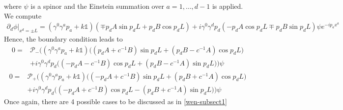  where $\psi $ is a spinor and the Einstein summation over $a = 1, \ldots, d-1$ is applied. \\
 We compute
\begin{equation*}
\begin{split}
\partial_d \phi\vert_{x^d = \pm L }
= (\gamma^0\gamma^a p_a + k\mathbb{1})(\mp p_d A \sin p_d L + p_d B \cos p_d L)
+ i\gamma^0\gamma^d p_d(-p_d A \cos p_d L \mp p_d B \sin p_d L)\psi e^{-ip_a x^a}
\end{split}
\end{equation*}
Hence, the boundary condition leads to
\begin{equation*}
\begin{split}
0 = &\mathcal{P}_-\Bigg(
(\gamma^0\gamma^a p_a + k\mathbb{1})\Big((p_d A + c^{-1}B) \sin p_d L + (p_d B - c^{-1}A) \cos p_d L\Big) \\
& + i\gamma^0\gamma^d p_d \Big((-p_d A -c^{-1} B) \cos p_d L + (p_d B - c^{-1} A )\sin p_d L\Big) 
\Bigg)\psi
\end{split}
\end{equation*}
\begin{equation*}
\begin{split}
0 = &\mathcal{P}_+\Bigg(
(\gamma^0\gamma^a p_a + k\mathbb{1})\Big((- p_d A + c^{-1}B) \sin p_d L + (p_d B + c^{-1}A) \cos p_d L\Big) \\
& + i\gamma^0\gamma^d p_d \Big((-p_d A + c^{-1} B )\cos p_d L - (p_d B + c^{-1} A )\sin p_d L\Big) 
\Bigg)\psi
\end{split}
\end{equation*}
Once again, there are 4 possible cases to be discussed as in \cref{wen-subsect1}
%

